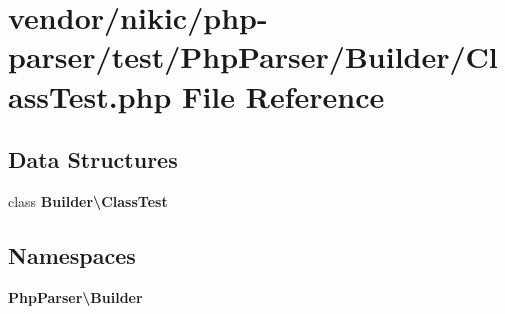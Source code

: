 \section{vendor/nikic/php-\/parser/test/\+Php\+Parser/\+Builder/\+Class\+Test.php File Reference}
\label{nikic_2php-parser_2test_2_php_parser_2_builder_2_class_test_8php}
\subsection*{Data Structures}
\begin{DoxyCompactItemize}
\item 
class {\bf Builder\textbackslash{}\+Class\+Test}
\end{DoxyCompactItemize}
\subsection*{Namespaces}
\begin{DoxyCompactItemize}
\item 
 {\bf Php\+Parser\textbackslash{}\+Builder}
\end{DoxyCompactItemize}
